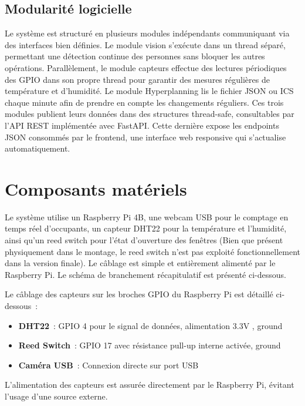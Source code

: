 \documentclass[a4paper,12pt]{report}
\begin{document}
\newpage
\subsection{Modularité logicielle}
Le système est structuré en plusieurs modules indépendants communiquant via des interfaces bien définies. Le module vision s'exécute dans un thread séparé, permettant une détection continue des personnes sans bloquer les autres opérations. Parallèlement, le module capteurs effectue des lectures périodiques des GPIO dans son propre thread pour garantir des mesures régulières de température et d'humidité. Le module Hyperplanning lis le fichier JSON ou ICS chaque minute afin de prendre en compte les changements réguliers. Ces trois modules publient leurs données dans des structures thread-safe, consultables par l'API REST implémentée avec FastAPI. Cette dernière expose les endpoints JSON consommés par le frontend, une interface web responsive qui s'actualise automatiquement.

\section{Composants matériels}

Le système utilise un Raspberry Pi 4B, une webcam USB pour le comptage en temps réel d'occupants, un capteur DHT22 pour la température et l'humidité, ainsi qu'un reed switch pour l'état d'ouverture des fenêtres (Bien que présent physiquement dans le montage, le reed switch n'est pas exploité fonctionnellement dans la version finale). Le câblage est simple et entièrement alimenté par le Raspberry Pi. Le schéma de branchement récapitulatif est présenté ci-dessous.


Le câblage des capteurs sur les broches GPIO du Raspberry Pi est détaillé ci-dessous~:

\begin{itemize}
    \item \textbf{DHT22}~: GPIO 4 pour le signal de données, alimentation 3.3V , ground 
    \item \textbf{Reed Switch}~: GPIO 17 avec résistance pull-up interne activée, ground
    \item \textbf{Caméra USB}~: Connexion directe sur port USB

\end{itemize}

L'alimentation des capteurs est assurée directement par le Raspberry Pi, évitant l'usage d'une source externe.
\end{document}
